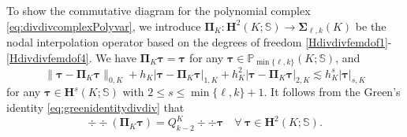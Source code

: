 To show the commutative diagram for the polynomial complex \eqref{eq:divdivcomplexPolyvar}, we introduce $\boldsymbol \Pi_K: \boldsymbol{H}^2(K; \mathbb{S})\to\boldsymbol \Sigma_{\ell,k}(K)$ be the nodal interpolation operator based on the degrees of freedom \eqref{Hdivdivfemdof1}-\eqref{Hdivdivfemdof4}. We have $\boldsymbol \Pi_K\boldsymbol \tau=\boldsymbol \tau$ for any $\boldsymbol \tau\in\mathbb P_{\min\{\ell,k\}}(K;\mathbb S)$, and
\begin{equation}\label{eq:PiKestimate}
\|\boldsymbol \tau-\boldsymbol \Pi_K\boldsymbol \tau\|_{0,K}+h_K|\boldsymbol \tau-\boldsymbol \Pi_K\boldsymbol \tau|_{1,K}+h_K^2|\boldsymbol \tau-\boldsymbol \Pi_K\boldsymbol \tau|_{2,K}\lesssim h_K^{s}|\boldsymbol \tau|_{s, K}
\end{equation}
for any $\boldsymbol \tau\in\boldsymbol{H}^s(K; \mathbb{S})$
with $2\leq s\leq \min\{\ell,k\}+1$. It follows from the Green's identity \eqref{eq:greenidentitydivdiv} that
\begin{equation}\label{eq:PiKcd}
\div\div(\boldsymbol \Pi_K\boldsymbol \tau)=Q_{k-2}^K\div \div\boldsymbol \tau\quad\forall~\boldsymbol \tau\in\boldsymbol{H}^2(K; \mathbb{S}).
\end{equation}


